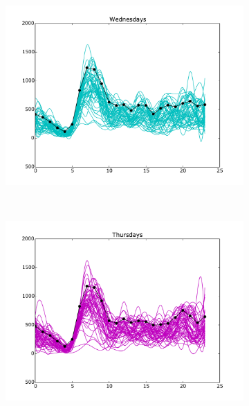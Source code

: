 \documentclass[10pt,a4paper]{amsart}
\begin{document}
\begin{figure}
    \begin{subfigure}[b]{0.6\textwidth}
        \includegraphics[width=\textwidth]
        		{Figures/Daily_trends_AC_Wednesday.pdf}
    \end{subfigure}
    ~
    \begin{subfigure}[b]{0.6\textwidth}
        \includegraphics[width=\textwidth]
        		{Figures/Daily_trends_AC_Thursday.pdf}
    \end{subfigure}
    

\end{figure}
\end{document}
